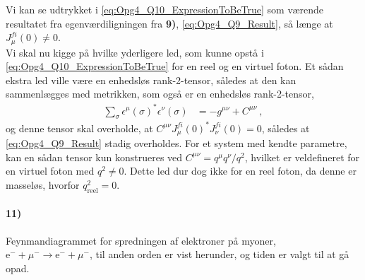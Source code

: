 \documentclass[../main.tex]{subfiles}
\begin{document}
Vi kan se udtrykket i \cref{eq:Opg4_Q10_ExpressionToBeTrue} som værende resultatet fra egenværdiligningen fra \textbf{9)}, \cref{eq:Opg4_Q9_Result}, så længe at $J_\mu^{fi}(0) \ne 0$.
\\

Vi skal nu kigge på hvilke yderligere led, som kunne opstå i \cref{eq:Opg4_Q10_ExpressionToBeTrue} for en reel og en virtuel foton. Et sådan ekstra led ville være en enhedsløs rank-2-tensor, således at den kan sammenlægges med metrikken, som også er en enhedsløs rank-2-tensor,
\begin{align}
    \sum_\sigma \epsilon^\mu(\sigma)^* \epsilon^\nu(\sigma) &= -g^{\mu\nu} + C^{\mu\nu} \: ,
\end{align}
og denne tensor skal overholde, at $C^{\mu\nu} J_\mu^{fi}(0)^* J_\nu^{fi}(0) = 0$, således at \cref{eq:Opg4_Q9_Result} stadig overholdes. For et system med kendte parametre, kan en sådan tensor kun konstrueres ved $C^{\mu\nu} = q^\mu q^\nu / q^2$, hvilket er veldefineret for en virtuel foton med $q^2 \ne 0$. Dette led dur dog ikke for en reel foton, da denne er masseløs, hvorfor $q_{\mathrm{reel}}^2 = 0$.



\paragraph[11) Feynmandiagram for spredning af elektroner på myoner]{\textbf{11)}}

Feynmandiagrammet for spredningen af elektroner på myoner, $\mathrm{e}^- + \mu^- \rightarrow \mathrm{e}^- + \mu^-$, til anden orden er vist herunder, og tiden er valgt til at gå opad.

\end{document}

